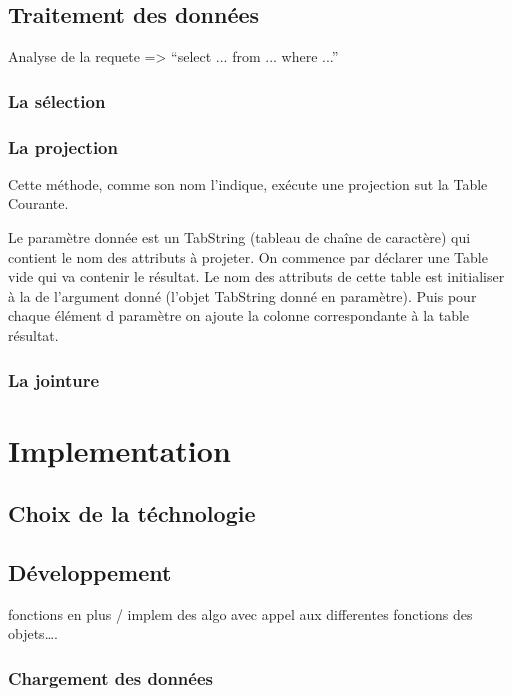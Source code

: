 \documentclass[oneside,13pt,a4paper]{report}
\begin{document}
\section{Traitement des données}

Analyse de la requete => \enquote{select ... from ... where ...}

\subsection{La sélection}

\subsection{La projection}

Cette méthode, comme son nom l'indique, exécute une projection sut la Table Courante.

Le paramètre donnée est un TabString (tableau de chaîne de caractère) qui contient le nom des attributs à projeter.
On commence par déclarer une Table vide qui va contenir le résultat.
Le nom des attributs de cette table est initialiser à la de l'argument donné (l'objet TabString donné en paramètre).
Puis pour chaque élément d paramètre on ajoute la colonne correspondante à la table résultat.

\subsection{La jointure}


\chapter{Implementation}

\section{Choix de la téchnologie}

\section{Développement}

fonctions en plus / implem des algo avec appel aux differentes fonctions des objets….

\subsection{Chargement des données}
\end{document}
